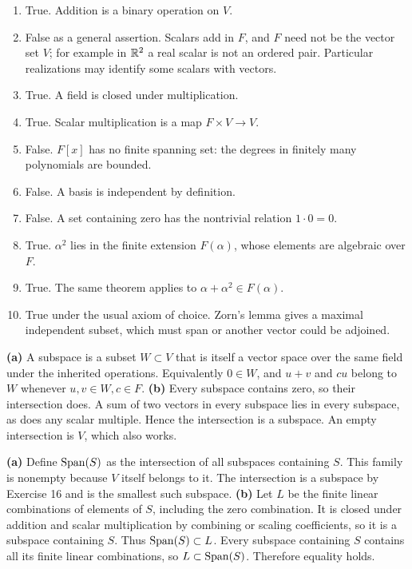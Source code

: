 \begin{enumerate}[label=(\alph*)]
\item True. Addition is a binary operation on $V$.
\item False as a general assertion. Scalars add in $F$, and $F$ need not be the vector set $V$; for example in $\mathbb{R}^2$ a real scalar is not an ordered pair. Particular realizations may identify some scalars with vectors.
\item True. A field is closed under multiplication.
\item True. Scalar multiplication is a map $F\times V\to V$.
\item False. $F[x]$ has no finite spanning set: the degrees in finitely many polynomials are bounded.
\item False. A basis is independent by definition.
\item False. A set containing zero has the nontrivial relation $1\cdot0=0$.
\item True. $\alpha^2$ lies in the finite extension $F(\alpha)$, whose elements are algebraic over $F$.
\item True. The same theorem applies to $\alpha+\alpha^2\in F(\alpha)$.
\item True under the usual axiom of choice. Zorn's lemma gives a maximal independent subset, which must span or another vector could be adjoined.
\end{enumerate}

\textbf{(a)} A subspace is a subset $W\subset V$ that is itself a vector space over the same field under the inherited operations. Equivalently $0\in W$, and $u+v$ and $cu$ belong to $W$ whenever $u,v\in W,c\in F$.
\textbf{(b)} Every subspace contains zero, so their intersection does. A sum of two vectors in every subspace lies in every subspace, as does any scalar multiple. Hence the intersection is a subspace. An empty intersection is $V$, which also works.

\textbf{(a)} Define $\operatorname{Span}(S)$ as the intersection of all subspaces containing $S$. This family is nonempty because $V$ itself belongs to it. The intersection is a subspace by Exercise 16 and is the smallest such subspace.
\textbf{(b)} Let $L$ be the finite linear combinations of elements of $S$, including the zero combination. It is closed under addition and scalar multiplication by combining or scaling coefficients, so it is a subspace containing $S$. Thus $\operatorname{Span}(S)\subset L$. Every subspace containing $S$ contains all its finite linear combinations, so $L\subset\operatorname{Span}(S)$. Therefore equality holds.

